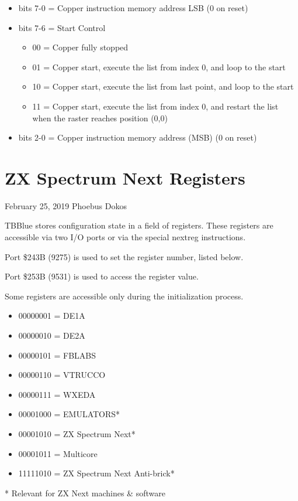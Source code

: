 \begin{itemize}
\item bits 7-0 = Copper instruction memory address LSB (0 on reset)
\end{itemize}

\begin{itemize}
\item bits 7-6 = Start Control
  \begin{itemize}
  \item[] 00 = Copper fully stopped
  \item[] 01 = Copper start, execute the list from index 0, and loop
    to the start
  \item[] 10 = Copper start, execute the list from last point, and
    loop to the start
  \item[] 11 = Copper start, execute the list from index 0, and
    restart the list when the raster reaches position (0,0)
  \end{itemize}
\item bits 2-0 = Copper instruction memory address (MSB) (0 on reset)
\end{itemize}

\section{ZX Spectrum Next Registers}
February 25, 2019  Phoebus Dokos

TBBlue stores configuration state in a field of registers. These
registers are accessible via two I/O ports or via the special nextreg
instructions.

Port \$243B (9275) is used to set the register number, listed below.

Port \$253B (9531) is used to access the register value.

Some registers are accessible only during the initialization process.

\begin{itemize}
\item 00000001 = DE1A
\item 00000010 = DE2A
\item 00000101 = FBLABS
\item 00000110 = VTRUCCO
\item 00000111 = WXEDA
\item 00001000 = EMULATORS*
\item 00001010 = ZX Spectrum Next*
\item 00001011 = Multicore
\item 11111010 = ZX Spectrum Next Anti-brick*
\end{itemize}
* Relevant for ZX Next machines \& software

